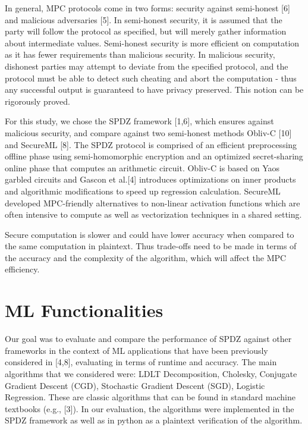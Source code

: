 \documentclass{article}
\begin{document}
In general, MPC protocols come in two forms: security against semi-honest [6] and malicious adversaries [5]. In semi-honest security, it is assumed that the party will follow the protocol as specified, but will merely gather information about intermediate values. Semi-honest security is more efficient on computation as it has fewer requirements than malicious security. In malicious security, dishonest parties may attempt to deviate from the specified protocol, and the protocol must be able to detect such cheating and abort the computation - thus any successful output is guaranteed to have privacy preserved. This notion can be rigorously proved.

For this study, we chose the SPDZ framework [1,6], which ensures against malicious security, and compare against two semi-honest methods Obliv-C [10] and SecureML [8]. The SPDZ protocol is comprised of an efficient preprocessing offline phase using semi-homomorphic encryption and an optimized secret-sharing online phase that computes an arithmetic circuit. Obliv-C is based on Yao\textquotesingle s garbled circuits and Gascon et al.[4]  introduces optimizations on inner products and algorithmic modifications to speed up regression calculation. SecureML developed MPC-friendly alternatives to non-linear activation functions which are often intensive to compute as well as vectorization techniques in a shared setting. 

Secure computation is slower and could have lower accuracy when compared to the same computation in plaintext. Thus trade-offs need to be made in terms of the accuracy and the complexity of the algorithm, which will affect the MPC efficiency.

\section{ML Functionalities}

Our goal was to evaluate and compare the performance of SPDZ against other frameworks in the context of ML applications that have been previously considered in [4,8], evaluating in terms of runtime and accuracy. The main algorithms that we considered were: LDLT Decomposition, Cholesky, Conjugate Gradient Descent (CGD), Stochastic Gradient Descent (SGD), Logistic Regression. These are classic algorithms that can be found in standard machine textbooks (e.g., [3]). In our evaluation, the algorithms were implemented in the SPDZ framework as well as in python as a plaintext verification of the algorithm.
\end{document}
